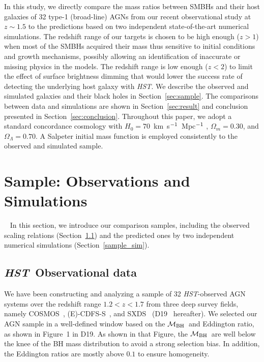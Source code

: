 \documentclass[twocolumn,trackchanges]{aastex63}
\newcommand{\hst}{{\it HST}}
\newcommand{\mbh}{$\mathcal M_{\rm BH}$}
\newcommand{\kmsMpc}{km~s$^{\rm -1}$~Mpc$^{\rm -1}$}
\begin{document}
In this study, we directly compare the mass ratios between SMBHs and their host galaxies of 32 type-1 (broad-line) AGNs from our recent observational study at $z\sim1.5$ \citep{Ding2019} to the predictions based on two independent state-of-the-art numerical simulations. The redshift range of our targets is chosen to be high enough ($z>1$) when most of the SMBHs acquired their mass thus sensitive to initial
conditions and growth mechanisms, possibly allowing an identification of inaccurate or missing physics in the models. The redshift range is low enough ($z<2$) to limit the effect of surface brightness dimming that would lower the success rate of detecting the underlying host galaxy with \hst. We describe the observed and simulated galaxies and their black holes in Section~\ref{sec:sample}. The comparisons between data and simulations are shown in Section~\ref{sec:result} and conclusion presented in Section~\ref{sec:conclusion}. Throughout this paper, we adopt a standard concordance
cosmology with $H_0 = 70$~\kmsMpc
, $\Omega_m = 0.30$,
and $\Omega_\Lambda = 0.70$. A Salpeter initial mass function is employed consistently to the
observed and simulated sample.


\section{Sample: Observations and Simulations}~\label{sec:sample}
In this section, we introduce our comparison samples, including the observed scaling relations (Section~\ref{hst_sample}) and the predicted ones by two independent numerical simulations (Section~\ref{sample_sim}).
	
\subsection{\hst\ Observational data}\label{hst_sample}
	
We have been constructing and analyzing a sample of 32 \hst-observed AGN systems over the redshift range $1.2<z<1.7$ from three deep survey fields, namely COSMOS~\citep{Civano2016}, (E)-CDFS-S~\citep{Lehmer2005, Xue2011}, and SXDS~\citep{Ueda2008} (D19~\citep{Ding2019} hereafter).
We selected our AGN sample in a well-defined window based on the \mbh\ and Eddington ratio, as shown in Figure~1 in D19. As shown in that Figure, the \mbh\ are well below the knee of the BH mass distribution to avoid a strong selection bias. In addition, the Eddington ratios are mostly above $0.1$ to ensure homogeneity.
\end{document}
